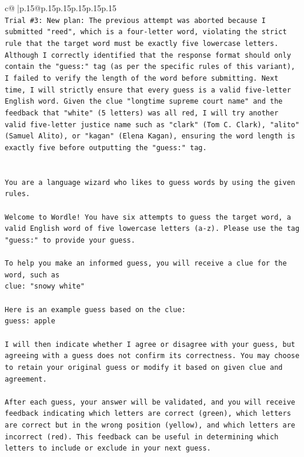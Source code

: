 \documentclass{article}
\begin{document}
{\begin{supertabular}{c@{$\;$}|p{.15\linewidth}@{}p{.15\linewidth}p{.15\linewidth}p{.15\linewidth}p{.15\linewidth}p{.15\linewidth}}
{{{\\ 
\texttt{Trial \#3: New plan: The previous attempt was aborted because I submitted "reed", which is a four{-}letter word, violating the strict rule that the target word must be exactly five lowercase letters. Although I correctly identified that the response format should only contain the "guess:" tag (as per the specific rules of this variant), I failed to verify the length of the word before submitting. Next time, I will strictly ensure that every guess is a valid five{-}letter English word. Given the clue "longtime supreme court name" and the feedback that "white" (5 letters) was all red, I will try another valid five{-}letter justice name such as "clark" (Tom C. Clark), "alito" (Samuel Alito), or "kagan" (Elena Kagan), ensuring the word length is exactly five before outputting the "guess:" tag.} \\
\\ 
\\ 
\texttt{You are a language wizard who likes to guess words by using the given rules.} \\
\\ 
\texttt{Welcome to Wordle! You have six attempts to guess the target word, a valid English word of five lowercase letters (a{-}z). Please use the tag "guess:" to provide your guess.} \\
\\ 
\texttt{To help you make an informed guess, you will receive a clue for the word, such as} \\
\texttt{clue: "snowy white"} \\
\\ 
\texttt{Here is an example guess based on the clue: } \\
\texttt{guess: apple} \\
\\ 
\texttt{I will then indicate whether I agree or disagree with your guess, but agreeing with a guess does not confirm its correctness. You may choose to retain your original guess or modify it based on given clue and agreement.} \\
\\ 
\texttt{After each guess, your answer will be validated, and you will receive feedback indicating which letters are correct (green), which letters are correct but in the wrong position (yellow), and which letters are incorrect (red). This feedback can be useful in determining which letters to include or exclude in your next guess.} \\
\\ 
}}}
\end{supertabular}}
\end{document}
